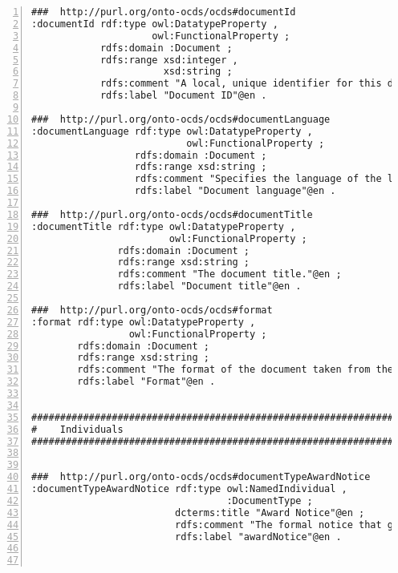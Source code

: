 \begin{lstlisting}[captionpos=b, caption={Extracto de código de la ontología OCDSPY}, label={lst:ocdspyAnexo},  numbers=left,  numberstyle=\tiny\color{mygray},frame=single, breaklines=true]
###  http://purl.org/onto-ocds/ocds#documentId
:documentId rdf:type owl:DatatypeProperty ,
                     owl:FunctionalProperty ;
            rdfs:domain :Document ;
            rdfs:range xsd:integer ,
                       xsd:string ;
            rdfs:comment "A local, unique identifier for this document. This field is used to keep track of multiple revisions of a document through the compilation from release to record mechanism."@en ;
            rdfs:label "Document ID"@en .

###  http://purl.org/onto-ocds/ocds#documentLanguage
:documentLanguage rdf:type owl:DatatypeProperty ,
                           owl:FunctionalProperty ;
                  rdfs:domain :Document ;
                  rdfs:range xsd:string ;
                  rdfs:comment "Specifies the language of the linked document using either two-digit [ISO 639-1](https://en.wikipedia.org/wiki/List_of_ISO_639-1_codes), or extended [BCP47 language tags](http://www.w3.org/International/articles/language-tags/). The use of two-letter codes from [ISO 639-1](https://en.wikipedia.org/wiki/List_of_ISO_639-1_codes) is strongly recommended unless there is a clear user need for distinguishing the language subtype."@en ;
                  rdfs:label "Document language"@en .

###  http://purl.org/onto-ocds/ocds#documentTitle
:documentTitle rdf:type owl:DatatypeProperty ,
                        owl:FunctionalProperty ;
               rdfs:domain :Document ;
               rdfs:range xsd:string ;
               rdfs:comment "The document title."@en ;
               rdfs:label "Document title"@en .

###  http://purl.org/onto-ocds/ocds#format
:format rdf:type owl:DatatypeProperty ,
                 owl:FunctionalProperty ;
        rdfs:domain :Document ;
        rdfs:range xsd:string ;
        rdfs:comment "The format of the document taken from the [IANA Media Types code list](http://www.iana.org/assignments/media-types/), with the addition of one extra value for 'offline/print', used when this document entry is being used to describe the offline publication of a document. Use values from the template column. Links to web pages should be tagged 'text/html'."@en ;
        rdfs:label "Format"@en .


#################################################################
#    Individuals
#################################################################


###  http://purl.org/onto-ocds/ocds#documentTypeAwardNotice
:documentTypeAwardNotice rdf:type owl:NamedIndividual ,
                                  :DocumentType ;
                         dcterms:title "Award Notice"@en ;
                         rdfs:comment "The formal notice that gives details of the contract award. This may be a link to a downloadable document, to a web page, or to an official gazette in which the notice is contained."@en ;
                         rdfs:label "awardNotice"@en .



\end{lstlisting}
